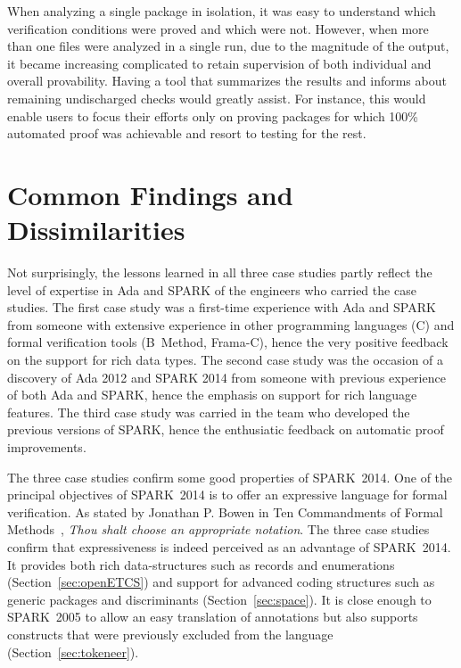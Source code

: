 \documentclass[10pt,a4paper,twocolumn]{article}
\newcommand{\oldspark}{SPARK~2005\xspace}
\newcommand{\newspark}{SPARK~2014\xspace}
\newcommand{\etc}{\textit{etc.}\xspace}
\begin{document}
When analyzing a single package in isolation, it was easy to
understand which verification conditions were proved and which were
not. However, when more than one files were analyzed in a single run,
due to the magnitude of the output, it became increasing complicated
to retain supervision of both individual and overall
provability. Having a tool that summarizes the results and informs
about remaining undischarged checks would greatly assist. For
instance, this would enable users to focus their efforts only on
proving packages for which 100\% automated proof was achievable and
resort to testing for the rest.

\section{Common Findings and Dissimilarities}

Not surprisingly, the lessons learned in all three case studies partly reflect
the level of expertise in Ada and SPARK of the engineers who carried the case
studies. The first case study was a first-time experience with Ada and SPARK
from someone with extensive experience in other programming languages (C) and
formal verification tools (B~Method, Frama-C), hence the very positive feedback
on the support for rich data types. The second case study was the occasion of a
discovery of Ada 2012 and SPARK 2014 from someone with previous experience of
both Ada and SPARK, hence the emphasis on support for rich language
features. The third case study was carried in the team who developed the
previous versions of SPARK, hence the enthusiatic feedback on automatic proof
improvements.

The three case studies confirm some good properties of \newspark.
One of the principal objectives of \newspark is to offer an expressive
language for formal verification. As stated by Jonathan P. Bowen in
Ten Commandments of Formal Methods~\cite{bowen1995ten}, \emph{Thou shalt choose
an appropriate notation}. The three case studies confirm that
expressiveness is indeed perceived as an advantage of \newspark. It provides
both rich data-structures such as records and enumerations
(Section~\ref{sec:openETCS}) and support for advanced coding structures such as
generic packages and discriminants (Section~\ref{sec:space}). It is close enough
to \oldspark to allow an easy translation of annotations but also supports
constructs that were previously excluded from the language
(Section~\ref{sec:tokeneer}).
\end{document}
